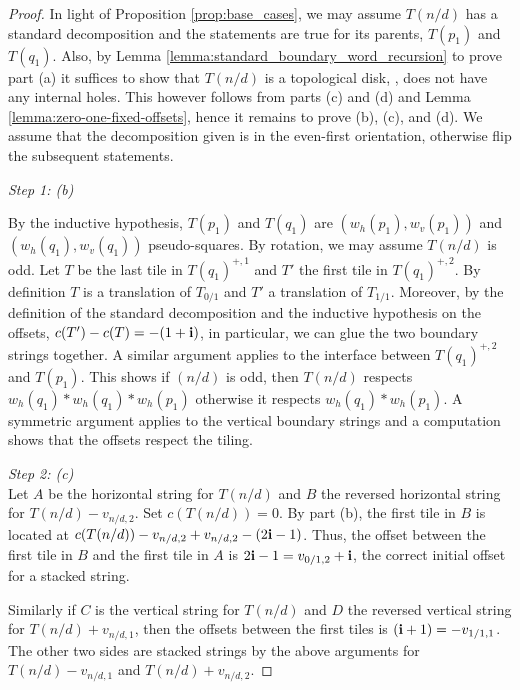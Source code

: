 \documentclass[12pt]{amsart}
\begin{document}
\begin{proof}
	In light of Proposition \ref{prop:base_cases}, we may assume $T(n/d)$ has a standard decomposition 
	and the statements are true for its parents, $T(p_1)$ and $T(q_1)$.  Also, by Lemma \ref{lemma:standard_boundary_word_recursion}
	to prove part (a) it suffices to show that $T(n/d)$ is a topological disk, \ie, does not have any internal holes. This however follows from parts (c) and (d) and Lemma \ref{lemma:zero-one-fixed-offsets}, 
	hence it remains to prove (b), (c), and (d). We assume that the decomposition given is in the even-first orientation, 
	otherwise flip the subsequent statements. 
	
	
	{\it Step 1: (b)}
	
	By the inductive hypothesis, $T(p_1)$ and $T(q_1)$ are $(w_h(p_1), w_v(p_1))$ and $(w_h(q_1), w_v(q_1))$
	pseudo-squares. By rotation, we may assume $T(n/d)$ is odd. Let $T$ be the last tile in $T(q_1)^{+,1}$ and $T'$ the first tile in $T(q_1)^{+,2}$. 
	By definition $T$ is a translation of $T_{0/1}$ and $T'$ a translation of $T_{1/1}$. Moreover, 
	by the definition of the standard decomposition and the inductive hypothesis on the offsets, $c(T')-c(T) = -(1+ \mathbf{i})$, 
	in particular, we can glue the two boundary strings together. A similar argument applies to the interface between 
	$T(q_1)^{+,2}$ and $T(p_1)$. This shows if $(n/d)$ is odd, then $T(n/d)$ respects $w_h(q_1)*w_h(q_1)*w_h(p_1)$ otherwise
	it respects $w_h(q_1)*w_h(p_1)$. A symmetric argument applies to the vertical boundary strings and a computation
	shows that the offsets respect the tiling. 
	
	{\it Step 2: (c)} \\
	Let $A$ be the horizontal string for $T(n/d)$ and $B$ the reversed horizontal string for 
	$T(n/d) - v_{n/d, 2}$. Set $c(T(n/d)) = 0$. By part (b), the first tile in $B$ is located at $c(T(n/d)) - v_{n/d,2} + v_{n/d,2} - (2 \mathbf{i} - 1)$. Thus, the offset between the first tile in $B$ and the first tile in $A$ is $2 \mathbf{i} - 1 = v_{0/1,2} + \mathbf{i}$, the correct
	initial offset for a stacked string. 
	
	Similarly if $C$ is the vertical string for $T(n/d)$ and $D$ the reversed vertical string for $T(n/d) + v_{n/d,1}$, then 
	the offsets between the first tiles is $(\mathbf{i}+1) = -v_{1/1,1}$. The other two sides are stacked strings by the above arguments 
	for $T(n/d) - v_{n/d,1}$ and $T(n/d) + v_{n/d,2}$.  


\end{proof}
\end{document}
